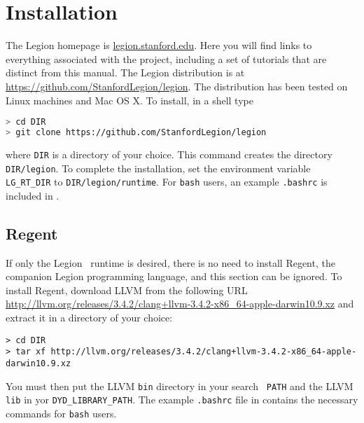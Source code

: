 
\chapter{Installation}
\label{chap:start}

The Legion homepage is \url{legion.stanford.edu}.  Here you will find
links to everything associated with the project, including a set of
tutorials that are distinct from this manual.  The Legion distribution is at
\url{https://github.com/StanfordLegion/legion}.  The distribution has been
tested on Linux machines and Mac OS X.  To install, in a shell type
\begin{lstlisting}[language=bash]
> cd DIR
> git clone https://github.com/StanfordLegion/legion
\end{lstlisting}
where {\tt DIR} is a directory of your choice.  This command creates 
the directory {\tt DIR/legion}.  To complete the installation,
set the environment variable {\tt LG\_RT\_DIR} to {\tt DIR/legion/runtime}.
For {\tt bash} users, an example {\tt .bashrc} is included in
.

\section{Regent}

If only the Legion \Cpp\ runtime is desired, there is no need to install Regent, the companion
Legion programming language, and this section can be ignored.  To install Regent, download LLVM
from the following URL
{\small\url{http://llvm.org/releases/3.4.2/clang+llvm-3.4.2-x86_64-apple-darwin10.9.xz}}
and extract it in a directory of your choice:
{\small
\begin{verbatim}
> cd DIR
> tar xf http://llvm.org/releases/3.4.2/clang+llvm-3.4.2-x86_64-apple-darwin10.9.xz
\end{verbatim}
}
You must then put the LLVM {\tt bin} directory in your search {\tt
  PATH} and the LLVM {\tt lib} in yor {\tt DYD\_LIBRARY\_PATH}.  The
example {\tt .bashrc} file in  contains the
necessary commands for {\tt bash} users.
